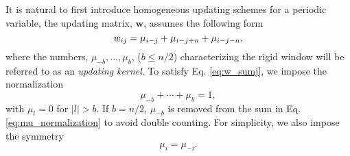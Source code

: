 \documentclass[reprint, superscriptaddress, floatfix]{revtex4-1}
\begin{document}



It is natural to first introduce homogeneous updating schemes
for a periodic variable\cite{dama2014},
the updating matrix, $\mathbf w$,
assumes the following form
%
\begin{equation}
  w_{ij}
  =
  \mu_{i-j}
  +
  \mu_{i-j+n}
  +
  \mu_{i-j-n}
  ,
\notag
\end{equation}
%
where the numbers,
$\mu_{-b}, \dots, \mu_b$, ($b \le n/2$)
characterizing the rigid window
will be referred to as an \emph{updating kernel}\cite{bussi2006}.
%
To satisfy Eq. \eqref{eq:w_sumj},
we impose the normalization
%
\begin{equation}
  \mu_{-b} + \cdots + \mu_b = 1
  ,
\label{eq:mu_normalization}
\end{equation}
%
with $\mu_l = 0$ for $|l| > b$.
%
If $b = n/2$, $\mu_{-b}$ is removed
from the sum in Eq. \eqref{eq:mu_normalization}
to avoid double counting.
%
For simplicity, we also impose the symmetry
%
\begin{equation}
  \mu_i = \mu_{-i}
  .
\label{eq:mu_symm}
\end{equation}
\end{document}

